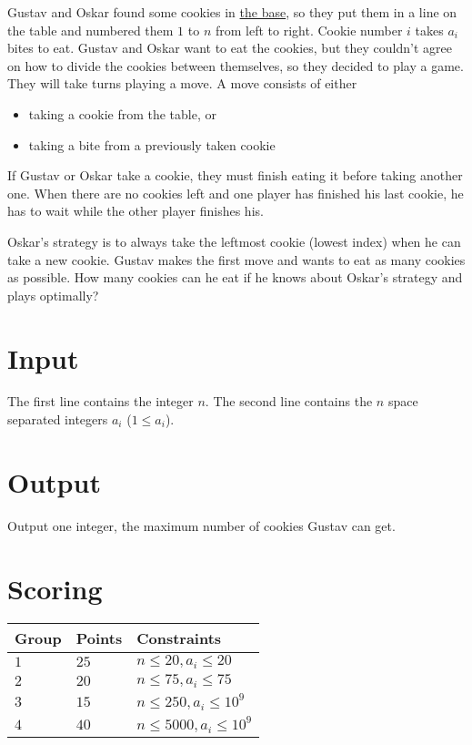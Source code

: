
\noindent Gustav and Oskar found some cookies in
\href{https://wiki.dtek.se/wiki/Basen}{the base}, so they put them in a line on
the table and numbered them $1$ to $n$ from left to right.  Cookie number $i$
takes $a_i$ bites to eat. Gustav and Oskar want to eat the cookies, but they
couldn't agree on how to divide the cookies between themselves, so they decided
to play a game. They will take turns playing a move. A move consists of either

\begin{itemize}
  \item taking a cookie from the table, or
  \item taking a bite from a previously taken cookie
\end{itemize}

\noindent If Gustav or Oskar take a cookie, they must finish eating it before
taking another one.  When there are no cookies left and one player has finished
his last cookie, he has to wait while the other player finishes his.

Oskar's strategy is to always take the leftmost cookie (lowest index) when he
can take a new cookie.  Gustav makes the first move and wants to eat as many
cookies as possible. How many cookies can he eat if he knows about Oskar's
strategy and plays optimally?

\section*{Input}
The first line contains the integer $n$.  The second line contains the $n$ space
separated integers $a_i$ ($1 \leq a_i$).

\section*{Output}
Output one integer, the maximum number of cookies Gustav can get.

\section*{Scoring}

\noindent
\begin{tabular}{| l | l | l |}
\hline
Group & Points     & Constraints \\ \hline
$1$   & $25$       & $n \leq 20, a_i \leq 20$ \\ \hline
$2$   & $20$       & $n \leq 75, a_i \leq 75$ \\ \hline
$3$   & $15$       & $n \leq 250, a_i \leq 10^9$ \\ \hline
$4$   & $40$       & $n \leq 5000, a_i \leq 10^9$ \\ \hline
\end{tabular}
